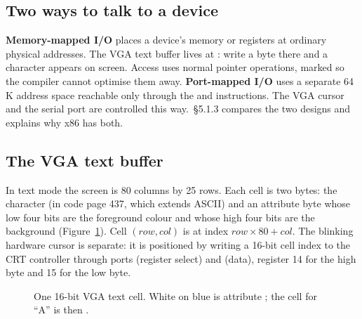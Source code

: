 \documentclass[11pt,a4paper]{article}
\begin{document}
\subsection{Two ways to talk to a device}

\textbf{Memory-mapped I/O} places a device's memory or registers at ordinary physical addresses. The VGA text buffer
lives at : write a byte there and a character appears on screen. Access uses normal pointer operations,
marked  so the compiler cannot optimise them away. \textbf{Port-mapped I/O} uses a separate 64\,K
address space reachable only through the  and  instructions. The VGA cursor and the serial port
are controlled this way. \MOS\,\S5.1.3 compares the two designs and explains why x86 has both.

\subsection{The VGA text buffer}

In text mode the screen is 80 columns by 25 rows. Each cell is two bytes: the character (in code page 437, which
extends ASCII) and an attribute byte whose low four bits are the foreground colour and whose high four bits are the
background (Figure~\ref{fig:vgacell}). Cell $(row, col)$ is at index $row \times 80 + col$. The blinking hardware
cursor is separate: it is positioned by writing a 16-bit cell index to the CRT controller through ports
 (register select) and  (data), register 14 for the high byte and 15 for the low byte.

\begin{figure}[htbp]
\centering
{}
\caption{One 16-bit VGA text cell. White on blue is attribute ; the cell for ``A'' is then .}
\label{fig:vgacell}
\end{figure}
\end{document}
